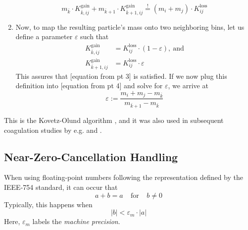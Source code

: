\begin{enumerate}
\begin{equation}
                    m_{\bar k}\cdot K_{\bar k,ij}^\text{gain}
                    +m_{\bar k+1}\cdot K_{\bar k+1,ij}^\text{gain}
                    \overset{!}{=}(m_i+m_j)\cdot K_{ij}^\text{loss}
                \end{equation}
            \item Now, to map the resulting particle's mass onto two neighboring bins, let us    
                define a parameter $\varepsilon$ such that
                \begin{align}
                    K_{\bar k,ij}^\text{gain}
                        &=K_{ij}^\text{loss}\cdot(1-\varepsilon),\ \text{and}\\
                    K_{\bar k+1,ij}^\text{gain}
                        &=K_{ij}^\text{loss}\cdot\varepsilon
                \end{align}
                This assures that [equation from pt 3] is satisfied. If we now plug this
                definition into [equation from pt 4] and solve for $\varepsilon$, we
                arrive at
                \begin{equation}
                    \varepsilon
                        :=\frac{m_i+m_j-m_{\bar k}}{m_{\bar k+1}-m_{\bar k}}
                \end{equation}
        \end{enumerate}
        This is the Kovetz-Olund algorithm \cite{kovetz_olund_1969}, and it was also used in subsequent 
        coagulation studies by e.g. \cite{brauer_dullemond_henning_2007} and 
        \cite{birnstiel_dullemond_brauer_2010}.
    
    \clearpage\subsection{Near-Zero-Cancellation Handling}
    
        When using floating-point numbers following the representation defined
        by the IEEE-754 standard, it can occur that
        \begin{equation}
          a+b=a
          \ \ \ \ \ \text{for} \ \ \ \ \
          b\neq0
        \end{equation}
        Typically, this happens when
        \begin{equation}
            |b|<\varepsilon_m\cdot|a|
        \end{equation}
        Here, $\varepsilon_m$ labels the \textit{machine precision}.
        \\
        
